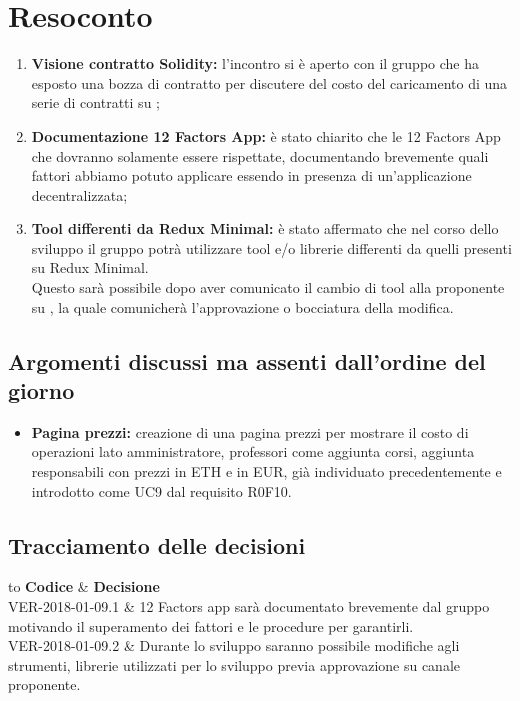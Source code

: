 \documentclass[VER-2018-01-09.tex]{subfiles}
\begin{document}
\chapter{Resoconto}
\begin{enumerate}
	\item \textbf{Visione contratto Solidity:} l'incontro si è aperto con il gruppo \gruppo che ha esposto una bozza di contratto  per discutere del costo del caricamento di una serie di contratti su  ;
	
	\item \textbf{Documentazione 12 Factors App:} è stato chiarito che le 12 Factors App che dovranno solamente essere rispettate, documentando brevemente quali fattori abbiamo potuto applicare essendo in presenza di un'applicazione decentralizzata;
	
	\item \textbf{Tool differenti da Redux Minimal:} è stato affermato che nel corso dello sviluppo il gruppo potrà utilizzare tool e/o librerie differenti da quelli presenti su Redux Minimal.\\
	Questo sarà possibile dopo aver comunicato il cambio di tool alla proponente su , la quale comunicherà l'approvazione o bocciatura della modifica.
\end{enumerate}
\section{Argomenti discussi ma assenti dall'ordine del giorno}
\begin{itemize}
	\item \textbf{Pagina prezzi:} creazione di una pagina prezzi per mostrare il costo di operazioni lato amministratore, professori come aggiunta corsi, aggiunta responsabili con prezzi in ETH e in EUR, già individuato precedentemente e introdotto come UC9 dal requisito R0F10.
\end{itemize}
\section{Tracciamento delle decisioni}
\begin{table}[H]
	\begin{center}
		\begin{tabu} to 
			\tableHeaderStyle
			\textbf{Codice} & \textbf{Decisione} \\
			VER-2018-01-09.1 & 12 Factors app sarà documentato brevemente dal gruppo motivando il superamento dei fattori e le procedure per garantirli. \\
			VER-2018-01-09.2 & Durante lo sviluppo saranno possibile modifiche agli strumenti, librerie utilizzati per lo sviluppo previa approvazione su canale  proponente. \\
		\end{tabu}
	\caption{Tracciamento delle decisioni del verbale}
	\end{center}
\end{table}
\end{document}
